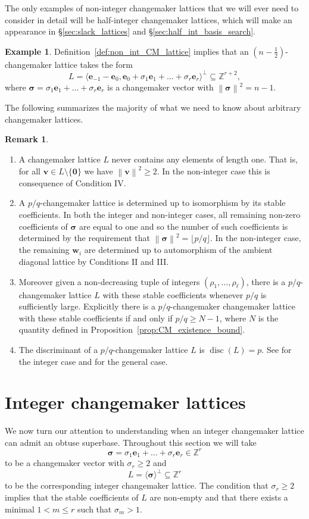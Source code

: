 \documentclass{amsart} %
\newcommand{\Z}{\mathbb{Z}}
\newcommand{\e}{\bm{e}}
\newcommand{\bv}{\bm{v}}
\newcommand{\bsigma}{\bm{\sigma}}
\newcommand{\norm}[1]{\left\lVert #1 \right\rVert^2}
\theoremstyle{thm}
\theoremstyle{definition}
\newtheorem{rem}[Theorem]{Remark}
\newtheorem{ex}[Theorem]{Example}
\numberwithin{equation}{section}
\begin{document}
The only examples of non-integer changemaker lattices that we will ever need to consider in detail will be half-integer changemaker lattices, which will make an appearance in \S\ref{sec:slack_lattices} and \S\ref{sec:half_int_basis_search}.
\begin{ex}\label{exam:half_integer_CM}
Definition~\ref{def:non_int_CM_lattice} implies that an $(n-\frac{1}{2})$-changemaker lattice takes the form
\[
L=\langle \e_{-1} -\e_0 ,\e_0 + \sigma_1 \e_1 + \dots + \sigma_r \e_r \rangle^\bot \subseteq \Z^{r+2},
\]
where $\bsigma=\sigma_1 \e_1 + \dots + \sigma_r \e_r$ is a changemaker vector with $\norm{\bsigma}=n-1$.
\end{ex}
The following summarizes the majority of what we need to know about arbitrary changemaker lattices. 
\begin{rem}\label{rem:CM_facts}\hfill
\begin{enumerate}
    \item\label{it:len1fact} A changemaker lattice $L$ never contains any elements of length one. That is, for all $\bv \in L\setminus\{\bm{0}\}$ we have $\norm{\bv}\geq 2$. In the non-integer case this is consequence of Condition IV.
    \item A $p/q$-changemaker lattice is determined up to isomorphism by its stable coefficients. In both the integer and non-integer cases, all remaining non-zero coefficients of $\bsigma$ are equal to one and so the number of such coefficients is determined by the requirement that $\norm{\bsigma}=\lfloor p/q \rfloor$. In the non-integer case, the remaining $\bm{w}_i$ are determined up to automorphism of the ambient diagonal lattice by Conditions II and III.
    \item\label{it:rational_existence} Moreover given a non-decreasing tuple of integers $(\rho_1, \dots, \rho_\ell)$, there is a $p/q$-changemaker lattice $L$ with these stable coefficients whenever $p/q$ is sufficiently large. Explicitly there is a $p/q$-changemaker changemaker lattice with these stable coefficients if and only if $p/q \geq N-1$, where $N$ is the quantity defined in Proposition~\ref{prop:CM_existence_bound}.
    \item\label{it:disc}The discriminant of a $p/q$-changemaker lattice $L$ is $\operatorname{disc}(L)=p$. See \cite[Lemma~3.10]{GreeneLRP} for the integer case and \cite[Remark~2.19]{Mc16} for the general case.
\end{enumerate}
\end{rem}

\section{Integer changemaker lattices}
We now turn our attention to understanding when an integer changemaker lattice can admit an obtuse superbase. Throughout this section we will take
\[
\bsigma=\sigma_1 \e_1 + \dots +\sigma_r\e_r\in \Z^r
\]
to be a changemaker vector with $\sigma_r\geq 2$ and
\[
L=\langle \bsigma\rangle^\bot\subseteq \Z^r
\]
to be the corresponding integer changemaker lattice. The condition that $\sigma_r\geq 2$ implies that the stable coefficients of $L$ are non-empty and that there exists a minimal $1<m\leq r$ such that $\sigma_m>1$.
\end{document}
